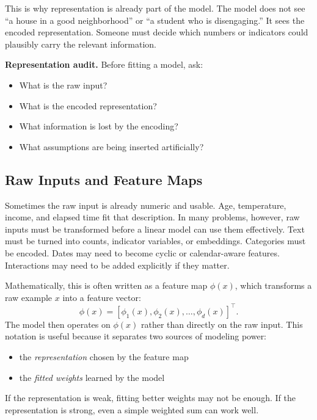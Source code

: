 This is why representation is already part of the model. The model does not see ``a house in a good neighborhood'' or ``a student who is disengaging.'' It sees the encoded representation. Someone must decide which numbers or indicators could plausibly carry the relevant information.

\begin{thinkingtool}
\textbf{Representation audit.} Before fitting a model, ask:
\begin{itemize}[leftmargin=*]
\item What is the raw input?
\item What is the encoded representation?
\item What information is lost by the encoding?
\item What assumptions are being inserted artificially?
\end{itemize}
\end{thinkingtool}

\subsection{Raw Inputs and Feature Maps}

Sometimes the raw input is already numeric and usable. Age, temperature, income, and elapsed time fit that description. In many problems, however, raw inputs must be transformed before a linear model can use them effectively. Text must be turned into counts, indicator variables, or embeddings. Categories must be encoded. Dates may need to become cyclic or calendar-aware features. Interactions may need to be added explicitly if they matter.

Mathematically, this is often written as a feature map $\phi(x)$, which transforms a raw example $x$ into a feature vector:
\[
\phi(x) = [\phi_1(x), \phi_2(x), \ldots, \phi_d(x)]^\top.
\]
The model then operates on $\phi(x)$ rather than directly on the raw input. This notation is useful because it separates two sources of modeling power:
\begin{itemize}[leftmargin=*]
\item the \emph{representation} chosen by the feature map
\item the \emph{fitted weights} learned by the model
\end{itemize}

If the representation is weak, fitting better weights may not be enough. If the representation is strong, even a simple weighted sum can work well.

